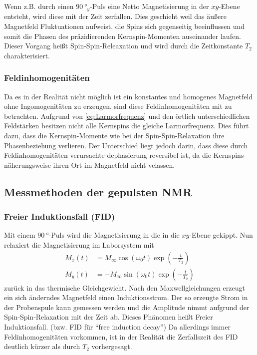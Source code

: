 Wenn z.B. durch einen $\SI{90}{\degree}_y$-Puls eine Netto Magnetisierung in der $xy$-Ebene entsteht, wird diese mit der Zeit zerfallen.
Dies geschieht weil das äußere Magnetfeld Fluktuationen aufweist, die Spins sich gegenseitig beeinflussen und somit die Phasen des präzidierenden Kernspin-Momenten auseinander laufen.
Dieser Vorgang heißt Spin-Spin-Releaxation und wird durch die Zeitkonstante $T_2$ charakterisiert.

\subsubsection{Feldinhomogenitäten}
\label{sssec:Feldinhomogenitäten}

Da es in der Realität nicht möglich ist ein konstantes und homogenes Magnetfeld ohne Ingomogenitäten zu erzeugen,
sind diese Feldinhomogenitäten mit zu betrachten.
Aufgrund von \autoref{eq:Larmorfrequenz} und den örtlich unterschiedlichen Feldstärken besitzen nicht alle Kernspins die gleiche Larmorfrequenz.
Dies führt dazu, dass die Kernspin-Momente wie bei der Spin-Spin-Relaxation ihre Phasenbeziehung verlieren.
Der Unterschied liegt jedoch darin, dass diese durch Feldinhomogenitäten verursachte dephasierung reversibel ist, da die Kernspins näherungsweise ihren Ort im Magnetfeld nicht velassen.

\subsection{Messmethoden der gepulsten NMR}
\label{ssec:Messmethoden}

\subsubsection{Freier Induktionsfall (FID)}
\label{sssec:FID}

Mit einem $\SI{90}{\degree}$-Puls wird die Magnetisierung in die in die $xy$-Ebene gekippt.
Nun relaxiert die Magnetisierung im Laborsystem mit 
\begin{align}
    M_x(t) &= M_\infty \cos(\omega_0 t) \exp\left( -\frac{t}{T_2} \right) \\
    M_y(t) &= -M_\infty \sin(\omega_0 t) \exp\left( -\frac{t}{T_2} \right)
\end{align}
zurück in das thermische Gleichgewicht.
Nach den Maxwellgleichungen erzeugt ein sich änderndes Magnetfeld einen Induktionsstrom.
Der so erzeugte Strom in der Probenspule kann gemessen werden und die Amplitude nimmt aufgrund der Spin-Spin-Relaxation mit der Zeit ab.
Dieses Phänomen heißt Freier Induktionsfall. (bzw. FID für \enquote{free induction decay})
Da allerdings immer Feldinhomogenitäten vorkommen, ist in der Realität die Zerfallszeit des FID deutlich kürzer als durch $T_2$ vorhergesagt.

